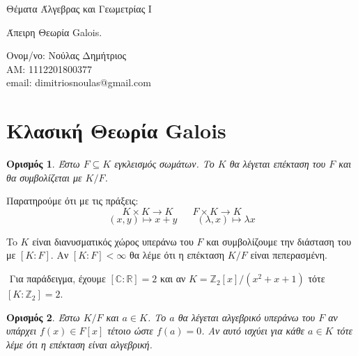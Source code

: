 \documentclass[oneside,a4paper]{article}
\newtheorem*{defn}{Ορισμός}
\newcommand {\tl}{\textlatin}
\newcommand{\Z}{\mathbb{Z}}
\begin{document}
	
	
	\begin{framed}	
		\begin{center}
			\huge Θέματα Άλγεβρας και Γεωμετρίας \tl{I}
		\end{center}
		\begin{center}
			\huge Άπειρη Θεωρία \tl{Galois}.
		\end{center}
		\vspace{0.3truecm}
		\begin{center}
			Ονομ/νο: Νούλας Δημήτριος\\
			ΑΜ: 1112201800377\\
			\tl{email}: \tl{dimitriosnoulas@gmail.com}
		\end{center}
		\vspace{0.3truecm}
	\end{framed}
\vspace{1cm}
\pagebreak
\tableofcontents
\pagebreak
\section{Κλασική Θεωρία \tl{Galois}}
\vspace{1cm}

\begin{defn}
	Έστω $F\subseteq K$ εγκλεισμός σωμάτων. Το $K$ θα λέγεται επέκταση του $F$ και θα συμβολίζεται με $K/F$.
\end{defn}

Παρατηρούμε ότι με τις πράξεις:
$$K\times K \longrightarrow K \quad\quad F \times K \longrightarrow K$$
$$(x,y) \longmapsto x+y \quad\quad (\lambda, x) \longmapsto \lambda x$$

To $K$ είναι διανυσματικός χώρος υπεράνω του $F$ και συμβολίζουμε την διάσταση του με $[K:F]$. Αν $[K:F]<\infty$ θα λέμε ότι η επέκταση $K/F$ είναι πεπερασμένη.

$ $\newline
Για παράδειγμα, έχουμε $[\mathbb C : \mathbb R] = 2$ και αν $K = \Z_2 [x]/(x^2 + x + 1)$ τότε $[K:\Z_2] = 2$.

\begin{defn}
	Έστω $K/F$ και $a \in K$. Το $a$ θα λέγεται αλγεβρικό υπεράνω του $F$ αν υπάρχει $f(x) \in F[x]$ τέτοιο ώστε $f(a)=0$. Αν αυτό ισχύει για κάθε $a \in K$ τότε λέμε ότι η επέκταση είναι αλγεβρική.
\end{defn}
\end{document}
